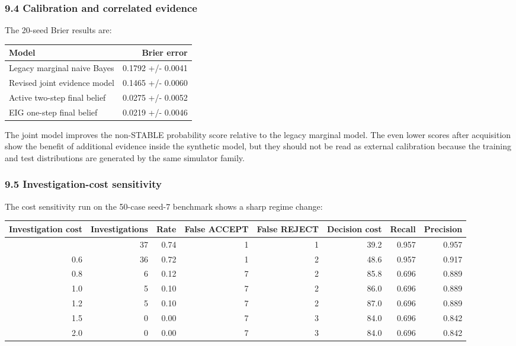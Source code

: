 \documentclass[
]{article}
\begin{document}
\subsubsection{9.4 Calibration and correlated evidence}\label{94-calibration-and-correlated-evidence}

The 20-seed Brier results are:

\begin{longtable}[]{@{}lr@{}}
\toprule\noalign{}
Model & Brier error \\
\midrule\noalign{}
\endhead
\bottomrule\noalign{}
\endlastfoot
Legacy marginal naive Bayes & 0.1792 +/- 0.0041 \\
Revised joint evidence model & 0.1465 +/- 0.0060 \\
Active two-step final belief & 0.0275 +/- 0.0052 \\
EIG one-step final belief & 0.0219 +/- 0.0046 \\
\end{longtable}

The joint model improves the non-STABLE probability score relative to the legacy marginal model. The even lower scores after acquisition show the benefit of additional evidence inside the synthetic model, but they should not be read as external calibration because the training and test distributions are generated by the same simulator family.

\subsubsection{9.5 Investigation-cost sensitivity}\label{95-investigation-cost-sensitivity}

The cost sensitivity run on the 50-case seed-7 benchmark shows a sharp regime change:

\begin{longtable}[]{@{}rrrrrrrr@{}}
\toprule\noalign{}
Investigation cost & Investigations & Rate & False ACCEPT & False REJECT & Decision cost & Recall & Precision \\
\midrule\noalign{}
\endhead
\bottomrule\noalign{}
\endlastfoot
0.4 & 37 & 0.74 & 1 & 1 & 39.2 & 0.957 & 0.957 \\
0.6 & 36 & 0.72 & 1 & 2 & 48.6 & 0.957 & 0.917 \\
0.8 & 6 & 0.12 & 7 & 2 & 85.8 & 0.696 & 0.889 \\
1.0 & 5 & 0.10 & 7 & 2 & 86.0 & 0.696 & 0.889 \\
1.2 & 5 & 0.10 & 7 & 2 & 87.0 & 0.696 & 0.889 \\
1.5 & 0 & 0.00 & 7 & 3 & 84.0 & 0.696 & 0.842 \\
2.0 & 0 & 0.00 & 7 & 3 & 84.0 & 0.696 & 0.842 \\
\end{longtable}
\end{document}
